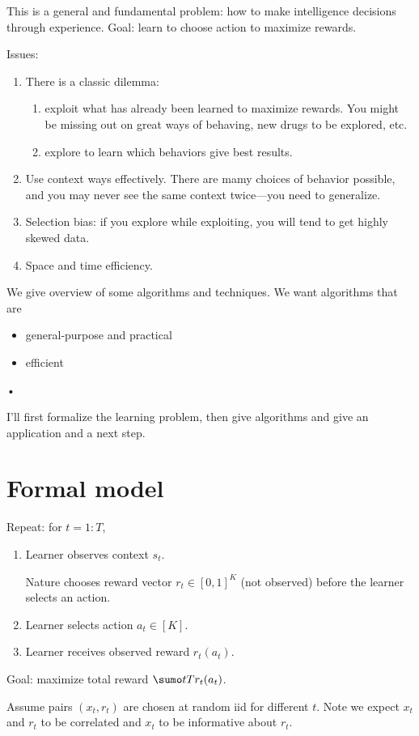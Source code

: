 This is a general and fundamental problem: how to make intelligence decisions through experience.
Goal: learn to choose action to maximize rewards.

Issues:
\begin{enumerate}
\item
There is a classic dilemma:
\begin{enumerate}
\item
exploit what has already been learned to maximize rewards. You might be missing out on great ways of behaving, new drugs to be explored, etc.
\item
explore to learn which behaviors give best results. 
\end{enumerate}
\item
Use context ways effectively. There are mamy choices of behavior possible, and you may never see the same context twice---you need to generalize.
\item
Selection bias: if you explore while exploiting, you will tend to get highly skewed data.
\item
Space and time efficiency.
\end{enumerate}

We give overview of some algorithms and techniques. We want algorithms that are
\begin{itemize}
\item
general-purpose and practical
\item
efficient
\end{itemize}•

I'll first formalize the learning problem, then give algorithms and give an application and a next step.
\section{Formal model}

Repeat: for $t=1:T$,
\begin{enumerate}
\item
Learner observes context $s_t$.

Nature chooses reward vector $r_t\in [0,1]^K$ (not observed) before the learner selects an action.
\item
Learner selects action $a_t\in [K]$.
\item
Learner receives observed reward $r_t(a_t)$.
\end{enumerate}
Goal: maximize total reward $\sumo tT r_t(a_t)$.

Assume pairs $(x_t,r_t)$ are chosen at random iid for different $t$. 
Note we expect $x_t$ and $r_t$ to be correlated and $x_t$ to be informative about $r_t$.


